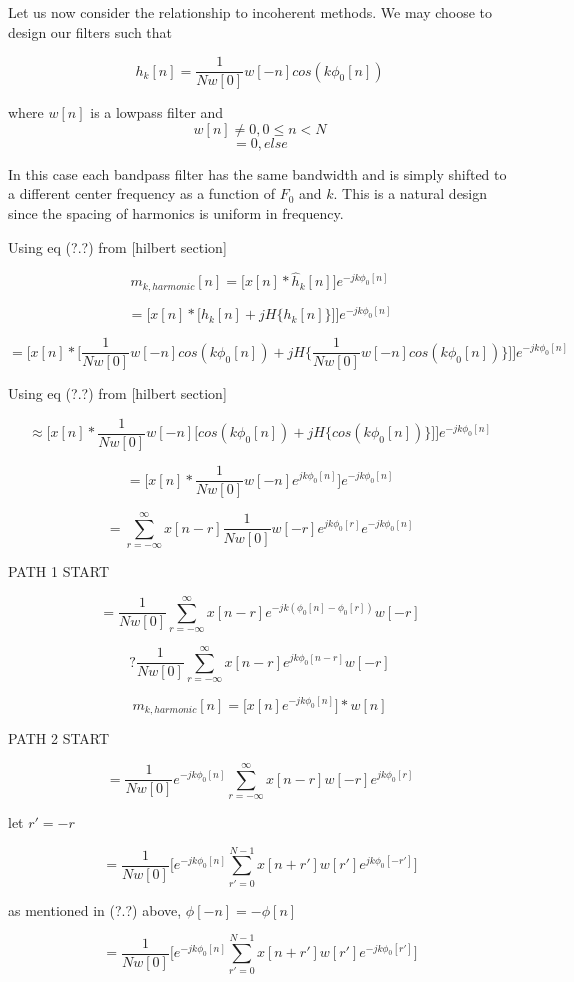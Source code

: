 \documentclass [11pt, proquest] {uwthesis}[2015/03/03]
\begin{document}
Let us now consider the relationship to incoherent methods.  We may choose to design our filters such that

$$h_k[n] = \frac{1}{Nw[0]} w[-n] cos( k \phi_0[n])$$

where $w[n]$ is a lowpass filter and 
$$w[n] \neq 0, 0 \leq n < N$$
$$ = 0, else$$

In this case each bandpass filter has the same bandwidth and is simply shifted to a different center frequency as a function of $F_0$ and $k$.  This is a natural design since the spacing of harmonics is uniform in frequency.

Using eq (?.?) from [hilbert section]

$$m_{k,harmonic}[n] =  \Big[ x[n] * \widehat{h}_k[n] \Big] e^{-jk \phi_0[n]}$$

$$=  \Bigg[ x[n] * \Big[ h_k[n]+  jH\{h_k[n]\} \Big] \Bigg] e^{-jk \phi_0[n]}$$

$$=  \Bigg[ x[n] * \Big[ \frac{1}{Nw[0]} w[-n] cos( k \phi_0[n]) +  jH\{\frac{1}{Nw[0]} w[-n] cos( k \phi_0[n])\} \Big] \Bigg] e^{-jk \phi_0[n]}$$

Using eq (?.?) from [hilbert section]

$$\approx  \Bigg[ x[n] *  \frac{1}{Nw[0]} w[-n] \Big[cos( k \phi_0[n]) +  jH\{cos( k \phi_0[n])\} \Big] \Bigg] e^{-jk \phi_0[n]}$$

$$=  \Bigg[ x[n] *  \frac{1}{Nw[0]} w[-n] e^{jk \phi_0[n]} \Bigg] e^{-jk \phi_0[n]}$$

$$= \sum_{r = -\infty}^\infty x[n - r] \frac{1}{Nw[0]}w[-r] e^{jk \phi_0[r]} e^{-jk \phi_0[n]}$$

PATH 1 START

$$= \frac{1}{Nw[0]} \sum_{r = -\infty}^\infty x[n - r] e^{-jk (\phi_0[n] - \phi_0[r])} w[-r]$$

$$? \frac{1}{Nw[0]} \sum_{r = -\infty}^\infty x[n - r] e^{jk \phi_0[n-r]} w[-r]$$

$$m_{k,harmonic}[n] =  \Big[ x[n] e^{-jk \phi_0[n]} \Big] * w[n]$$


PATH 2 START

$$=  \frac{1}{Nw[0]} e^{-jk \phi_0[n]} \sum_{r = -\infty}^\infty x[n - r] w[-r] e^{jk \phi_0[r]}$$

let $r' = -r$

$$= \frac{1}{Nw[0]} \bigg[ e^{-jk \phi_0[n]} \sum_{r' = 0}^{N-1} x[n + r'] w[r'] e^{jk \phi_0[-r']} \bigg]$$

as mentioned in (?.?) above, $\phi[-n] = -\phi[n]$

$$= \frac{1}{Nw[0]} \bigg[ e^{-jk \phi_0[n]} \sum_{r' = 0}^{N-1} x[n + r'] w[r'] e^{-jk \phi_0[r']} \bigg]$$
\end{document}
